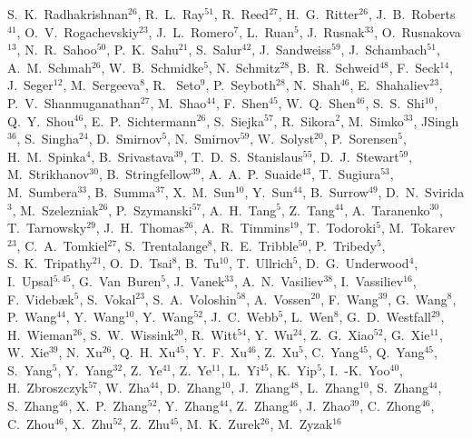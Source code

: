 \documentclass[%
 reprint,	
 amsmath,amssymb,
 aps,
 prc,
]{revtex4-1}
\begin{document}
{S.~K.~Radhakrishnan$^{26}$,
R.~L.~Ray$^{51}$,
R.~Reed$^{27}$,
H.~G.~Ritter$^{26}$,
J.~B.~Roberts$^{41}$,
O.~V.~Rogachevskiy$^{23}$,
J.~L.~Romero$^{7}$,
L.~Ruan$^{5}$,
J.~Rusnak$^{33}$,
O.~Rusnakova$^{13}$,
N.~R.~Sahoo$^{50}$,
P.~K.~Sahu$^{21}$,
S.~Salur$^{42}$,
J.~Sandweiss$^{59}$,
J.~Schambach$^{51}$,
A.~M.~Schmah$^{26}$,
W.~B.~Schmidke$^{5}$,
N.~Schmitz$^{28}$,
B.~R.~Schweid$^{48}$,
F.~Seck$^{14}$,
J.~Seger$^{12}$,
M.~Sergeeva$^{8}$,
R.~ Seto$^{9}$,
P.~Seyboth$^{28}$,
N.~Shah$^{46}$,
E.~Shahaliev$^{23}$,
P.~V.~Shanmuganathan$^{27}$,
M.~Shao$^{44}$,
F.~Shen$^{45}$,
W.~Q.~Shen$^{46}$,
S.~S.~Shi$^{10}$,
Q.~Y.~Shou$^{46}$,
E.~P.~Sichtermann$^{26}$,
S.~Siejka$^{57}$,
R.~Sikora$^{2}$,
M.~Simko$^{33}$,
JSingh$^{36}$,
S.~Singha$^{24}$,
D.~Smirnov$^{5}$,
N.~Smirnov$^{59}$,
W.~Solyst$^{20}$,
P.~Sorensen$^{5}$,
H.~M.~Spinka$^{4}$,
B.~Srivastava$^{39}$,
T.~D.~S.~Stanislaus$^{55}$,
D.~J.~Stewart$^{59}$,
M.~Strikhanov$^{30}$,
B.~Stringfellow$^{39}$,
A.~A.~P.~Suaide$^{43}$,
T.~Sugiura$^{53}$,
M.~Sumbera$^{33}$,
B.~Summa$^{37}$,
X.~M.~Sun$^{10}$,
Y.~Sun$^{44}$,
B.~Surrow$^{49}$,
D.~N.~Svirida$^{3}$,
M.~Szelezniak$^{26}$,
P.~Szymanski$^{57}$,
A.~H.~Tang$^{5}$,
Z.~Tang$^{44}$,
A.~Taranenko$^{30}$,
T.~Tarnowsky$^{29}$,
J.~H.~Thomas$^{26}$,
A.~R.~Timmins$^{19}$,
T.~Todoroki$^{5}$,
M.~Tokarev$^{23}$,
C.~A.~Tomkiel$^{27}$,
S.~Trentalange$^{8}$,
R.~E.~Tribble$^{50}$,
P.~Tribedy$^{5}$,
S.~K.~Tripathy$^{21}$,
O.~D.~Tsai$^{8}$,
B.~Tu$^{10}$,
T.~Ullrich$^{5}$,
D.~G.~Underwood$^{4}$,
I.~Upsal$^{5,45}$,
G.~Van~Buren$^{5}$,
J.~Vanek$^{33}$,
A.~N.~Vasiliev$^{38}$,
I.~Vassiliev$^{16}$,
F.~Videb{\ae}k$^{5}$,
S.~Vokal$^{23}$,
S.~A.~Voloshin$^{58}$,
A.~Vossen$^{20}$,
F.~Wang$^{39}$,
G.~Wang$^{8}$,
P.~Wang$^{44}$,
Y.~Wang$^{10}$,
Y.~Wang$^{52}$,
J.~C.~Webb$^{5}$,
L.~Wen$^{8}$,
G.~D.~Westfall$^{29}$,
H.~Wieman$^{26}$,
S.~W.~Wissink$^{20}$,
R.~Witt$^{54}$,
Y.~Wu$^{24}$,
Z.~G.~Xiao$^{52}$,
G.~Xie$^{11}$,
W.~Xie$^{39}$,
N.~Xu$^{26}$,
Q.~H.~Xu$^{45}$,
Y.~F.~Xu$^{46}$,
Z.~Xu$^{5}$,
C.~Yang$^{45}$,
Q.~Yang$^{45}$,
S.~Yang$^{5}$,
Y.~Yang$^{32}$,
Z.~Ye$^{41}$,
Z.~Ye$^{11}$,
L.~Yi$^{45}$,
K.~Yip$^{5}$,
I.~-K.~Yoo$^{40}$,
H.~Zbroszczyk$^{57}$,
W.~Zha$^{44}$,
D.~Zhang$^{10}$,
J.~Zhang$^{48}$,
L.~Zhang$^{10}$,
S.~Zhang$^{44}$,
S.~Zhang$^{46}$,
X.~P.~Zhang$^{52}$,
Y.~Zhang$^{44}$,
Z.~Zhang$^{46}$,
J.~Zhao$^{39}$,
C.~Zhong$^{46}$,
C.~Zhou$^{46}$,
X.~Zhu$^{52}$,
Z.~Zhu$^{45}$,
M.~K.~Zurek$^{26}$,
M.~Zyzak$^{16}$
}
\end{document}
